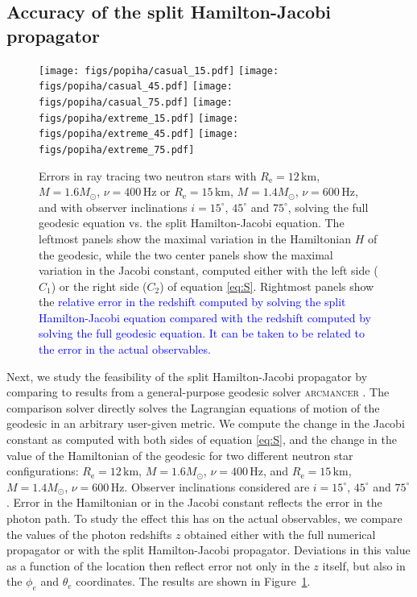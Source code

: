 \documentclass{aa}
\newcommand{\refe}[1]{\textcolor{blue}{{#1}}}
\newcommand{\Msun}{\ensuremath{M_{\odot}}}
\begin{document}
\subsection{Accuracy of the split Hamilton-Jacobi propagator}

\begin{figure}[htbp!]
\centering
\texttt{[image: figs/popiha/casual\_15.pdf]}
\texttt{[image: figs/popiha/casual\_45.pdf]}
\texttt{[image: figs/popiha/casual\_75.pdf]}
\texttt{[image: figs/popiha/extreme\_15.pdf]}
\texttt{[image: figs/popiha/extreme\_45.pdf]}
\texttt{[image: figs/popiha/extreme\_75.pdf]}
\caption{\label{fig:H_C1_C2}
    Errors in ray tracing two neutron stars with $R_{\mathrm{e}}=12\,\mathrm{km}$, $M=1.6\Msun$, $\nu=400\,\mathrm{Hz}$ or $R_{\mathrm{e}}=15\,\mathrm{km}$, $M=1.4\Msun$, $\nu=600\,\mathrm{Hz}$, and with observer inclinations $i=15^\circ$, $45^\circ$ and $75^\circ$, solving the full geodesic equation vs. the split Hamilton-Jacobi equation.
    The leftmost panels show the maximal variation in the Hamiltonian $H$ of the geodesic, while the two center panels show the maximal variation in the Jacobi constant, computed either with the left side ($C_1$) or the right side ($C_2$) of equation \eqref{eq:S}.
    Rightmost panels show the \refe{relative error in the redshift computed by solving the split Hamilton-Jacobi equation compared with the redshift computed by solving the full geodesic equation.}
    \refe{It can be taken to be related to the error in the actual observables.}
}
\end{figure}


Next, we study the feasibility of the split Hamilton-Jacobi propagator by comparing to results from a general-purpose geodesic solver \textsc{arcmancer} \citep{PRJ16}.
The comparison solver directly solves the Lagrangian equations of motion of the geodesic in an arbitrary user-given metric. 
We compute the change in the Jacobi constant as computed with both sides of equation \eqref{eq:S}, and the change in the value of the Hamiltonian of the geodesic for two different neutron star configurations:
$R_{\mathrm{e}}=12\,\mathrm{km}$, $M=1.6\Msun$, $\nu=400\,\mathrm{Hz}$, and $R_{\mathrm{e}}=15\,\mathrm{km}$, $M=1.4\Msun$, $\nu=600\,\mathrm{Hz}$.
Observer inclinations considered are $i=15^\circ$, $45^\circ$ and $75^\circ$.
Error in the Hamiltonian or in the Jacobi constant reflects the error in the photon path.
To study the effect this has on the actual observables, we compare the values of the photon redshifts $z$ obtained either with the full numerical propagator or with the split Hamilton-Jacobi propagator.
Deviations in this value as a function of the location then reflect error not only in the $z$ itself, but also in the $\phi_e$ and $\theta_e$ coordinates.
The results are shown in Figure~\ref{fig:H_C1_C2}. 
\end{document}
